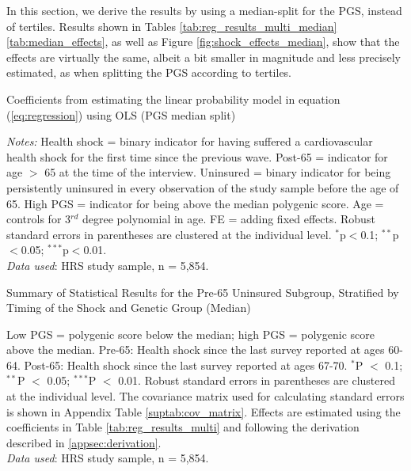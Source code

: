 In this section, we derive the results by using a median-split for the PGS, instead of tertiles.
Results shown in Tables \ref{tab:reg_results_multi_median} \ref{tab:median_effects}, as well as Figure \ref{fig:shock_effects_median}, show that the effects are virtually the same, albeit a bit smaller in magnitude and less precisely estimated, as when splitting the PGS according to tertiles.

\begin{table}[!ht] \centering
	\caption{Coefficients from estimating the linear probability model in equation (\ref{eq:regression}) using OLS (PGS median split) \vspace{-0.4cm}}
	\addtolength{\tabcolsep}{-7pt}
	\label{tab:reg_results_multi_median}
	\resizebox{0.60\textheight}{!}{
	
	} %
	\begin{flushleft}
	\textit{Notes:}
	Health shock = binary indicator for having suffered a cardiovascular health shock for the first time since the previous wave.
	Post-65 = indicator for age $>$ 65 at the time of the interview.
	Uninsured = binary indicator for being persistently uninsured in every observation of the study sample before the age of 65.
	High PGS = indicator for being above the median polygenic score.
    Age = controls for 3$^{rd}$ degree polynomial in age.
    FE = adding fixed effects.
	Robust standard errors in parentheses are clustered at the individual level.
	$^{*}$p$<$0.1; $^{**}$p$<$0.05; $^{***}$p$<$0.01.
	\\ \textit{Data used}: HRS study sample, n = 5,854.
	\end{flushleft}
\end{table}


\begin{table}[!ht]
	\caption{Summary of Statistical Results for the Pre-65 Uninsured Subgroup, Stratified by Timing of the Shock and Genetic Group (Median)}
	\label{tab:median_effects}
	
		\begin{flushleft}
			Low PGS = polygenic score below the median; high PGS = polygenic score above the median.
			Pre-65: Health shock since the last survey reported at ages 60-64.
			Post-65: Health shock since the last survey reported at ages 67-70.
			$^{*}$P $<$ 0.1; $^{**}$P $<$ 0.05; $^{***}$P $<$ 0.01. Robust standard errors in parentheses are clustered at the individual level.
			The covariance matrix used for calculating standard errors is shown in Appendix Table \ref{suptab:cov_matrix}.
			Effects are estimated using the coefficients in Table \ref{tab:reg_results_multi} and following the derivation described in \ref{appsec:derivation}.\\
			\textit{Data used}: HRS study sample, n = 5,854.
		\end{flushleft}
\end{table}




